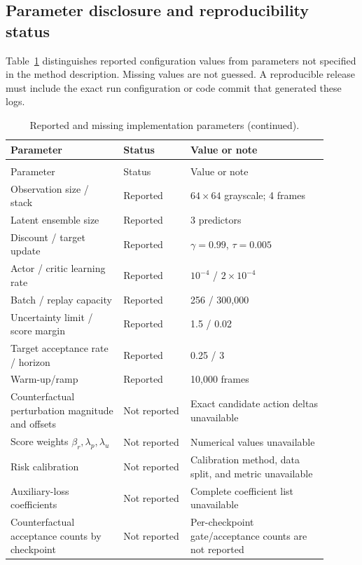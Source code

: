 \documentclass[11pt]{article}
\begin{document}
\subsection{Parameter disclosure and reproducibility status}\label{parameter-disclosure}

Table~\ref{tab:parameter-disclosure} distinguishes reported configuration values from parameters not specified in the method description. Missing values are not guessed. A reproducible release must include the exact run configuration or code commit that generated these logs.

\begin{longtable}{p{0.32\linewidth}p{0.19\linewidth}p{0.39\linewidth}}
\caption{Reported and missing implementation parameters.}\label{tab:parameter-disclosure}\\
\toprule
Parameter & Status & Value or note \\
\midrule
\endfirsthead
\caption[]{Reported and missing implementation parameters (continued).}\\
\toprule
Parameter & Status & Value or note \\
\midrule
\endhead
Observation size / stack & Reported & $64\times64$ grayscale; 4 frames \\
Latent ensemble size & Reported & 3 predictors \\
Discount / target update & Reported & $\gamma=0.99$, $\tau=0.005$ \\
Actor / critic learning rate & Reported & $10^{-4}$ / $2\times10^{-4}$ \\
Batch / replay capacity & Reported & 256 / 300,000 \\
Uncertainty limit / score margin & Reported & 1.5 / 0.02 \\
Target acceptance rate / horizon & Reported & 0.25 / 3 \\
Warm-up/ramp & Reported & 10,000 frames \\
Counterfactual perturbation magnitude and offsets & Not reported & Exact candidate action deltas unavailable \\
Score weights $\beta_r,\lambda_p,\lambda_u$ & Not reported & Numerical values unavailable \\
Risk calibration & Not reported & Calibration method, data split, and metric unavailable \\
Auxiliary-loss coefficients & Not reported & Complete coefficient list unavailable \\
Counterfactual acceptance counts by checkpoint & Not reported & Per-checkpoint gate/acceptance counts are not reported \\
\bottomrule
\end{longtable}
\end{document}
